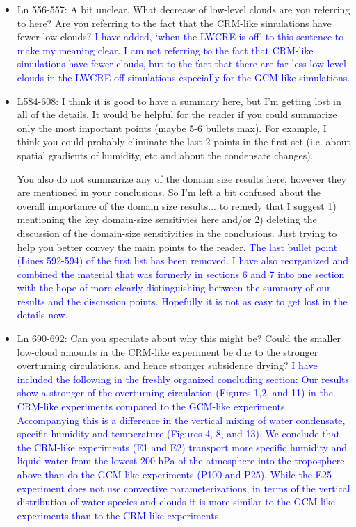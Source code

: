 \documentclass[draft]{agujournal2019}
\begin{document}
\begin{itemize}
  \item Ln 556-557: A bit unclear. What decrease of low-level clouds are you referring to here? Are you referring to the fact that the CRM-like simulations have fewer low clouds?
  \textcolor{blue}{I have added, `when the LWCRE is off' to this sentence to make my meaning clear.  I am not referring to the fact that CRM-like simulations have fewer clouds, but to the fact that there are far less low-level clouds in the LWCRE-off simulations 
  especially for the GCM-like simulations. }
  
  \item L584-608: I think it is good to have a summary here, but I'm getting lost in all of the details. It would be helpful for the reader if you could summarize only the most important points (maybe 5-6 bullets max). For example, I think you could probably eliminate the last 2 points in the first set (i.e. about spatial gradients of humidity, etc and about the condensate changes). 

You also do not summarize any of the domain size results here, however they are mentioned in your conclusions. So I'm left a bit confused about the overall importance of the domain size results... to remedy that I suggest 1) mentioning the key domain-size sensitivies here and/or 2)  deleting the discussion of the domain-size sensitivities in the conclusions. Just trying to help you better convey the main points to the reader.
  \textcolor{blue}{The last bullet point (Lines 592-594) of the first list has been removed.  I have also reorganized and combined the material that was 
  formerly in sections 6 and 7 into one section with the hope of more clearly distinguishing between the summary of our results and the discussion points.  Hopefully it is not as easy to get lost in the details now.}
 
  
  \item Ln 690-692: Can you speculate about why this might be? Could the smaller low-cloud amounts in the CRM-like experiment be due to the stronger overturning circulations, and hence stronger subsidence drying? 
  \textcolor{blue}{I have included the following in the freshly organized concluding section: 
  Our results show a stronger of the overturning circulation (Figures 1,2, and 11)
 in the CRM-like experiments compared to the GCM-like experiments.  
 Accompanying this is a difference in the vertical mixing of water condensate, specific
 humidity and temperature (Figures 4, 8, and 13).  We conclude that the CRM-like experiments (E1 and E2) transport more specific humidity 
 and liquid water from the lowest 200 hPa of the atmosphere into the troposphere above than do the GCM-like experiments 
 (P100 and P25).  While the E25 experiment does not use convective parameterizations, in terms of the vertical distribution of water
 species and clouds it is more similar to the GCM-like experiments than to the CRM-like experiments.}
  

\end{itemize}
\end{document}

